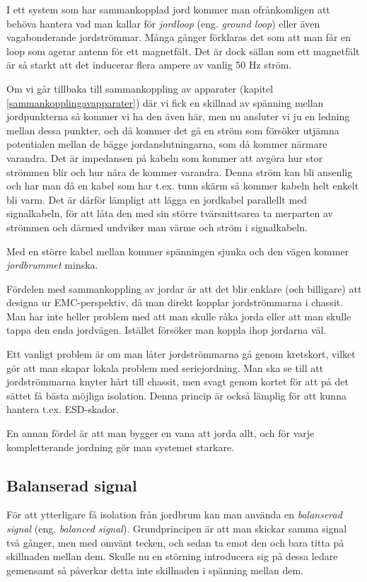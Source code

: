 I ett system som har sammankopplad jord kommer man ofrånkomligen att behöva
hantera vad man kallar för \emph{jordloop} (eng. \emph{ground loop}) eller även
vagabonderande jordströmmar. Många gånger förklaras det som att man får en
loop som agerar antenn för ett magnetfält. Det är dock sällan som ett
magnetfält är så starkt att det inducerar flera ampere av vanlig 50 Hz ström.

Om vi går tillbaka till sammankoppling av apparater (kapitel
\ref{sammankopplingavapparater}) där vi fick en skillnad av spänning mellan
jordpunkterna så kommer vi ha den även här, men nu ansluter vi ju en ledning
mellan dessa punkter, och då kommer det gå en ström som försöker utjämna
potentialen mellan de bägge jordanslutningarna, som då kommer närmare varandra.
Det är impedansen på kabeln som kommer att avgöra hur stor strömmen blir och hur
nära de kommer varandra. Denna ström kan bli ansenlig och har man då en kabel
som har t.ex. tunn skärm så kommer kabeln helt enkelt bli varm. Det är därför
lämpligt att lägga en jordkabel parallellt med signalkabeln, för att låta den
med sin större tvärsnittsarea ta merparten av strömmen och därmed undviker man
värme och ström i signalkabeln.

Med en större kabel mellan kommer spänningen sjunka och den vägen kommer
\emph{jordbrummet} minska.

Fördelen med sammankoppling av jordar är att det blir enklare (och billigare)
att designa ur EMC-perspektiv, då man direkt kopplar jordströmmarna i chassit.
Man har inte heller problem med att man skulle råka jorda eller att man skulle
tappa den enda jordvägen. Istället försöker man koppla ihop jordarna väl.

Ett vanligt problem är om man låter jordströmmarna gå genom kretskort, vilket
gör att man skapar lokala problem med seriejordning. Man ska se till att
jordströmmarna knyter hårt till chassit, men svagt genom kortet för att på det
sättet få bästa möjliga isolation. Denna princip är också lämplig för att
kunna hantera t.ex. ESD-skador.

En annan fördel är att man bygger en vana att jorda allt, och för varje
kompletterande jordning gör man systemet starkare.

\subsection{Balanserad signal}

För att ytterligare få isolation från jordbrum kan man använda en
\emph{balanserad signal} (eng. \emph{balanced signal}). Grundprincipen är att
man skickar samma signal två gånger, men med omvänt tecken, och sedan ta emot
den och bara titta på skillnaden mellan dem. Skulle nu en störning introducera
sig på dessa ledare gemensamt så påverkar detta inte skillnaden i spänning
mellan dem.

